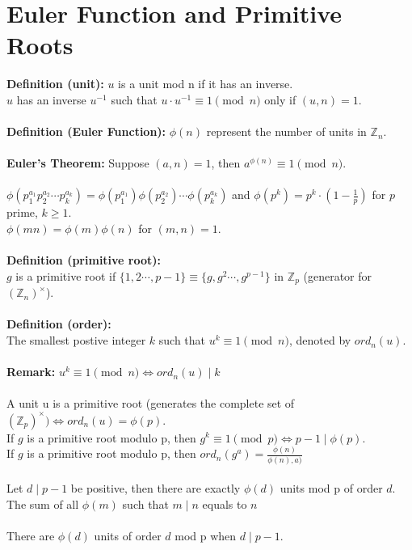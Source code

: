 \documentclass[12pt]{article}
\begin{document}
\section*{Euler Function and Primitive Roots}
\textbf{Definition (unit):} $u$ is a unit mod n if it has an inverse.\\
$u$ has an inverse $u^{-1}$ such that $u\cdot u^{-1}\equiv  1\pmod n$ only if $(u,n)=1$.\\
\\
\textbf{Definition (Euler Function):} $\phi(n)$ represent the number of units in $\mathbb{Z}_n$.\\
\\
\textbf{Euler's Theorem:} Suppose $(a,n)=1$, then $a^{\phi(n)}\equiv 1\pmod n$.\\
\\
$\phi(p_1^{a_1}p_2^{a_2}\cdots p_k^{a_k})=\phi(p_1^{a_1})\phi(p_2^{a_2})\cdots \phi(p_k^{a_k})$ and $\phi(p^k)=p^k\cdot (1-\frac{1}{p})$ for $p$ prime, $k\geq 1$.\\
$\phi(mn)=\phi(m)\phi(n)$ for $(m,n)=1$.\\
\\
\textbf{Definition (primitive root):}\\ $g$ is a primitive root if $\{1,2\cdots,p-1\}\equiv\{g,g^2\cdots,g^{p-1}\}$ in $\mathbb{Z}_p$ (generator for $(\mathbb{Z}_n)^\times$).\\
\\
\textbf{Definition (order):}\\ The smallest postive integer $k$ such that $u^k\equiv 1\pmod n$, denoted by $ord_n(u)$.\\
\\
\textbf{Remark:} $u^k\equiv 1\pmod n \iff ord_n(u)\mid k$\\
\\
A unit u is a primitive root (generates the complete set of $(\mathbb{Z}_p)^\times) \iff ord_n(u)=\phi(p)$.\\
If $g$ is a primitive root modulo p, then $g^k\equiv 1\pmod p \iff p-1\mid \phi(p)$.\\
If $g$ is a primitive root modulo p, then $ord_n(g^a)=\frac{\phi(n)}{\phi(n),a)}$\\
\\
Let $d\mid p-1$ be positive, then there are exactly $\phi(d)$ units mod p of order $d$.
\\
The sum of all $\phi(m)$ such that $m\mid n $ equals to $n$\\
\\
There are $\phi(d)$ units of order $d$ mod p when $d\mid p-1$.\\
\end{document}
